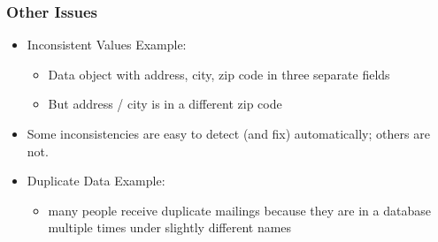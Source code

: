 

\begin{frame}[fragile] \frametitle{Other Issues}
\begin{itemize}
\item Inconsistent Values Example:
	\begin{itemize}
	\item Data object with address, city, zip code in three separate fields
	\item But address / city is in a different zip code
	\end{itemize}
\item Some inconsistencies are easy to detect (and fix) automatically; others are not.
\item Duplicate Data Example:
	\begin{itemize}
	\item many people receive duplicate mailings because they are in a database multiple times under slightly different names
	\end{itemize}
\end{itemize}
\end{frame}



